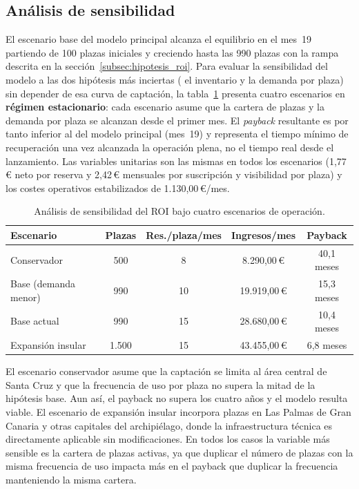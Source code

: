 \subsection{Análisis de sensibilidad}
\label{subsec:sensibilidad_roi}

El escenario base del modelo principal alcanza el equilibrio en el mes~19 partiendo de 100 plazas iniciales y creciendo hasta las 990 plazas con la rampa descrita en la sección~\ref{subsec:hipotesis_roi}. Para evaluar la sensibilidad del modelo a las dos hipótesis más inciertas ( el inventario y la demanda por plaza) sin depender de esa curva de captación, la tabla~\ref{tab:sensibilidad} presenta cuatro escenarios en \textbf{régimen estacionario}: cada escenario asume que la cartera de plazas y la demanda por plaza se alcanzan desde el primer mes. El \textit{payback} resultante es por tanto inferior al del modelo principal (mes~19) y representa el tiempo mínimo de recuperación una vez alcanzada la operación plena, no el tiempo real desde el lanzamiento. Las variables unitarias son las mismas en todos los escenarios (1,77\,€ neto por reserva y 2,42\,€ mensuales por suscripción y visibilidad por plaza) y los costes operativos estabilizados de 1.130,00\,€/mes.

\begin{table}[H]
    \centering
    \caption{Análisis de sensibilidad del ROI bajo cuatro escenarios de operación.}
    \label{tab:sensibilidad}
    \small
    \begin{tabular}{lcccc}
        \hline
        \textbf{Escenario}   & \textbf{Plazas} & \textbf{Res./plaza/mes} & \textbf{Ingresos/mes} & \textbf{Payback} \\
        \hline
        Conservador          & 500             & 8                       & 8.290,00\,€           & 40,1 meses       \\
        Base (demanda menor) & 990             & 10                      & 19.919,00\,€          & 15,3 meses       \\
        Base actual          & 990             & 15                      & 28.680,00\,€          & 10,4 meses       \\
        Expansión insular    & 1.500           & 15                      & 43.455,00\,€          & 6,8 meses        \\
        \hline
    \end{tabular}
\end{table}

El escenario conservador asume que la captación se limita al área central de Santa Cruz y que la frecuencia de uso por plaza no supera la mitad de la hipótesis base. Aun así, el payback no supera los cuatro años y el modelo resulta viable. El escenario de expansión insular incorpora plazas en Las Palmas de Gran Canaria y otras capitales del archipiélago, donde la infraestructura técnica es directamente aplicable sin modificaciones. En todos los casos la variable más sensible es la cartera de plazas activas, ya que duplicar el número de plazas con la misma frecuencia de uso impacta más en el payback que duplicar la frecuencia manteniendo la misma cartera.
